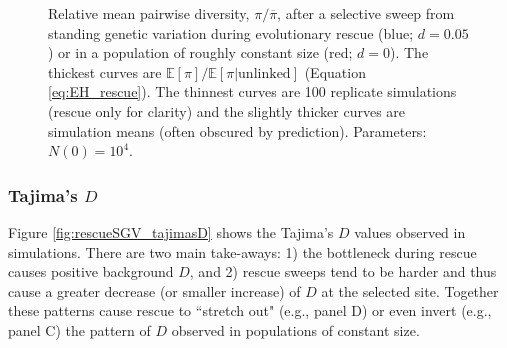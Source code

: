 \documentclass[]{article}
\begin{document}
\begin{figure}[htb]
\caption{
Relative mean pairwise diversity, $\pi/\overline{\pi}$, after a selective sweep from standing genetic variation during evolutionary rescue (blue; $d=0.05$) or in a population of roughly constant size (red; $d=0$).
The thickest curves are $\mathbb{E}[\pi]/\mathbb{E}[\pi|\mathrm{unlinked}]$ (Equation \ref{eq:EH_rescue}).
The thinnest curves are 100 replicate simulations (rescue only for clarity) and the slightly thicker curves are simulation means (often obscured by prediction).
Parameters: $N(0)=10^4$.
}%
\label{fig:rescueSGV_heterozygosity_relative}
\end{figure}

\subsubsection*{Tajima's $D$}

Figure \ref{fig:rescueSGV_tajimasD} shows the Tajima's $D$ values observed in simulations.
There are two main take-aways:
1) the bottleneck during rescue causes positive background $D$, and
2) rescue sweeps tend to be harder and thus cause a greater decrease (or smaller increase) of $D$ at the selected site.
Together these patterns cause rescue to ``stretch out" (e.g., panel D) or even invert (e.g., panel C) the pattern of $D$ observed in populations of constant size.
\end{document}
